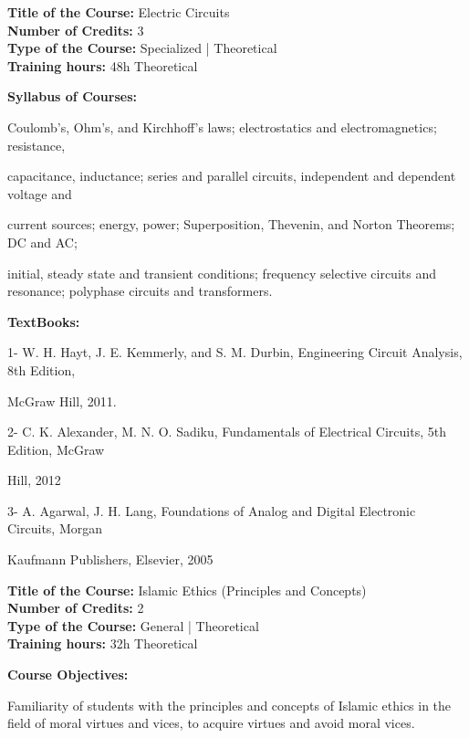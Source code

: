 \documentclass[12pt,a4paper]{article}
\begin{document}
\newpage
\textbf{Title of the Course:} Electric Circuits\\
\textbf{Number of Credits:} 3\\
\textbf{Type of the Course:} Specialized | Theoretical\\
\textbf{Training hours:} 48h Theoretical\par\vspace{4pt}
\textbf{Syllabus of Courses:}\par\vspace{2pt}
Coulomb's, Ohm's, and Kirchhoff’s laws; electrostatics and electromagnetics; resistance,\par
capacitance, inductance; series and parallel circuits, independent and dependent voltage and\par
current sources; energy, power; Superposition, Thevenin, and Norton Theorems; DC and AC;\par
initial, steady state and transient conditions; frequency selective circuits and resonance; polyphase circuits and transformers.\par\vspace{4pt}
\textbf{TextBooks:}\par\vspace{2pt}
1- W. H. Hayt, J. E. Kemmerly, and S. M. Durbin, Engineering Circuit Analysis, 8th Edition,\par
McGraw Hill, 2011.\par
2- C. K. Alexander, M. N. O. Sadiku, Fundamentals of Electrical Circuits, 5th Edition, McGraw\par
Hill, 2012\par
3- A. Agarwal, J. H. Lang, Foundations of Analog and Digital Electronic Circuits, Morgan\par
Kaufmann Publishers, Elsevier, 2005\par
\vspace{4pt}

\newpage
\nopagebreak
\textbf{Title of the Course:} Islamic Ethics (Principles and Concepts)\\
\textbf{Number of Credits:} 2\\
\textbf{Type of the Course:} General | Theoretical\\
\textbf{Training hours:} 32h Theoretical\par\vspace{4pt}
\textbf{Course Objectives:}\par\vspace{2pt}
Familiarity of students with the principles and concepts of Islamic ethics in the field of moral
virtues and vices, to acquire virtues and avoid moral vices.\par\vspace{4pt}
\end{document}
